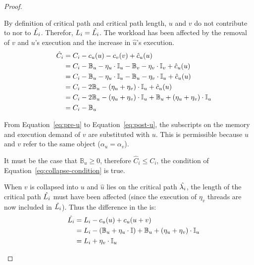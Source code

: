 \begin{theorem}
\begin{proof}
    \begin{case} By
      definition of critical path and critical path length, ${u}$ and
      ${v}$ do not contribute to  nor to
      ${\hat{\criticalpathlen{i}}}$. Therefor,
      ${\criticalpathlen{i} = \hat{\criticalpathlen{i}}}$. The
      workload has been affected by the removal of ${v}$ and ${u}$'s execution
      and the increase in ${\hat{u}}$'s execution. 
      \begin{align}
        \indent
        \hat{C}_i &= C_i - c_u(u) - c_v(v) + \hat{c}_u(u) \\
        &= C_i - \mathbb{B}_u - \eta_u \cdot \mathbb{I}_u
            - \mathbb{B}_v - \eta_v \cdot \mathbb{I}_v + \hat{c}_u(u)
            \label{eq:pre-u} \\
        &= C_i - \mathbb{B}_u - \eta_u \cdot \mathbb{I}_u
            - \mathbb{B}_u - \eta_v \cdot \mathbb{I}_u + \hat{c}_u(u)
            \label{eq:post-u} \\
        &= C_i -2\mathbb{B}_u - (\eta_u + \eta_v)\cdot \mathbb{I}_u +
            \hat{c}_u(u) \\
        &= C_i -2\mathbb{B}_u - (\eta_u + \eta_v)\cdot \mathbb{I}_u +
            \mathbb{B}_u + (\eta_u + \eta_v)\cdot \mathbb{I}_u \\
        &= C_i - \mathbb{B}_u
      \end{align}

      From Equation~\ref{eq:pre-u} to Equation~\ref{eq:post-u}, the
      subscripts on the memory and execution demand of ${v}$ are
      substituted with ${u}$. This is permissible because ${u}$ and
      ${v}$ refer to the same object (${\alpha_u = \alpha_v}$).

      It must be the case that ${\mathbb{B}_u \ge 0}$, therefore
      ${\hat{C}_i \le C_i}$, the condition of
      Equation~\ref{eq:collapse-condition} is true.
    \end{case}

    \begin{case} When ${v}$ is
      collapsed into ${u}$ and ${\hat{u}}$ lies on the critical path
      ${\hat{\criticalpath{i}}}$, the length of the critical path
      ${\hat{\criticalpathlen{i}}}$ must have been affected (since the
      execution of ${\eta_v}$ threads are now included in
      ${\hat{\criticalpathlen{i}}}$). Thus the difference in the
       is:
      \begin{align*}
        \indent
        \hat{L_i} &= L_i - c_u(u) + c_u(u + v) \\
        &= L_i - (\mathbb{B}_u + \eta_u \cdot \mathbb{I}) +
            \mathbb{B}_u + (\eta_u + \eta_v) \cdot \mathbb{I}_u \\
        &= L_i + \eta_v \cdot \mathbb{I}_u
      \end{align*}



\end{case}
\end{proof}
\end{theorem}
